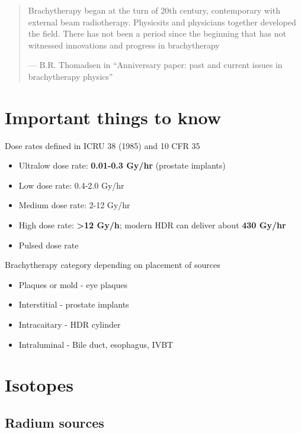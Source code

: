 \documentclass[]{book}
\providecommand{\tightlist}{%
  \setlength{\itemsep}{0pt}\setlength{\parskip}{0pt}}
\theoremstyle{definition}
\theoremstyle{definition}
\theoremstyle{definition}
\theoremstyle{remark}
\begin{document}
\begin{quote}
Brachytherapy began at the turn of 20th century, contemporary with
external beam radiotherapy. Physicsits and physicians together developed
the field. There has not been a period since the beginning that has not
witnessed innovations and progress in brachytherapy

--- B.R. Thomadsen in ``Anniversary paper: past and current issues in
brachytherapy physics''
\end{quote}

\section{Important things to know}\label{important-things-to-know}

Dose rates defined in ICRU 38 (1985) and 10 CFR 35

\begin{itemize}
\tightlist
\item
  Ultralow dose rate: \textbf{0.01-0.3 Gy/hr} (prostate implants)
\item
  Low dose rate: 0.4-2.0 Gy/hr
\item
  Medium dose rate: 2-12 Gy/hr
\item
  High dose rate: \textbf{\textgreater{}12 Gy/h}; modern HDR can deliver
  about \textbf{430 Gy/hr}
\item
  Pulsed dose rate
\end{itemize}

Brachytherapy category depending on placement of sources

\begin{itemize}
\tightlist
\item
  Plaques or mold - eye plaques
\item
  Interstitial - prostate implants
\item
  Intracaitary - HDR cylinder
\item
  Intraluminal - Bile duct, esophagus, IVBT
\end{itemize}

\section{Isotopes}\label{isotopes}

\subsection{Radium sources}\label{radium-sources}
\end{document}
